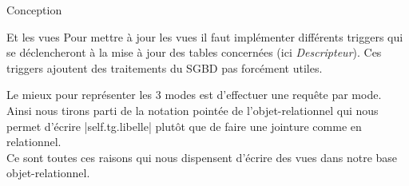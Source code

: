 \documentclass[a4paper, 12pt]{report}
\begin{document}
\begin{chapter}{Conception}
\begin{section}{Et les vues}
		Pour mettre à jour les vues il faut implémenter différents triggers qui se déclencheront à la mise à jour des tables concernées (ici \emph{Descripteur}).
		Ces triggers ajoutent des traitements du SGBD  pas forcément utiles.

		Le mieux pour représenter les 3 modes est d'effectuer 
		une requête par mode. Ainsi nous tirons parti de la notation pointée de l'objet-relationnel 
		qui nous permet d'écrire |self.tg.libelle| plutôt que de faire une jointure comme en relationnel.\\

		Ce sont toutes ces raisons qui nous dispensent d'écrire des vues dans notre base objet-relationnel.

	\end{section}
\end{chapter}
\end{document}
